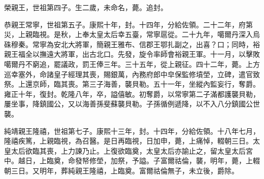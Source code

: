 \begin{pinyinscope}
榮親王，世祖第四子。生二歲，未命名，薨。追封。

恭親王常寧，世祖第五子。康熙十年，封。十四年，分給佐領。二十二年，府第災，上親臨視。是秋，上奉太皇太后幸五臺，常寧扈從。二十九年，噶爾丹深入烏硃穆秦。常寧為安北大將軍，簡親王雅布、信郡王鄂扎副之，出喜？口；同時，裕親王福全以撫遠大將軍，出古北口。先發，旋令率師會裕親王軍。十一月，以擊敗噶爾丹不窮追，罷議政，罰王俸三年。三十五年，從上親征。四十二年，薨。上方巡幸塞外，命諸皇子經理其喪，賜銀萬，內務府郎中皁保監修墳塋，立碑，遣官致祭。上還京師，臨其喪。第三子海善，襲貝勒。五十一年，坐縱內監妄行，奪爵。雍正十年，復封。乾隆八年，卒，謚僖敏。初奪爵，以常寧第二子滿都護襲貝勒，屢坐事，降鎮國公，又以海善孫斐蘇襲貝勒。子孫循例遞降，以不入八分鎮國公世襲。

純靖親王隆禧，世祖第七子。康熙十三年，封。十四年，分給佐領。十八年七月，隆禧疾篤，上親臨視，為召醫。是日再臨視，日加申，薨，上痛悼，輟朝三日。太皇太后欲臨其喪，上力諫乃止。上復欲臨奠，太皇太后亦諭止之，留太皇太后宮中。越日，上臨奠，命發帑修塋，加祭，予謚。子富爾祜倫，襲，明年，薨，上輟朝三日。又明年，葬純親王隆禧，上臨奠。富爾祜倫無子，未立後，爵除。


\end{pinyinscope}